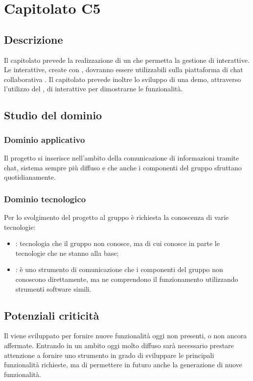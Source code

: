 \section{Capitolato C5}

\subsection{Descrizione}
Il capitolato prevede la realizzazione di un  che permetta la gestione di  interattive. Le  interattive, create con \ProjectName, dovranno essere utilizzabili sulla piattaforma di chat collaborativa .
Il capitolato prevede inoltre lo sviluppo di una demo, attraverso l'utilizzo del , di  interattive per dimostrarne le funzionalità.

\subsection{Studio del dominio}
\subsubsection{Dominio applicativo}
Il progetto si inserisce nell'ambito della comunicazione di informazioni tramite chat, sistema sempre più diffuso e che anche i componenti del gruppo sfruttano quotidianamente.

\subsubsection{Dominio tecnologico}
Per lo svolgimento del progetto al gruppo è richiesta la conoscenza di varie tecnologie:
\begin{itemize}
	\item {}: tecnologia che il gruppo non conosce, ma di cui conosce in parte le tecnologie che ne stanno alla base;
	\item {}: è uno strumento di comunicazione che i componenti del gruppo non conoscono direttamente, ma ne comprendono il funzionamento utilizzando strumenti software simili.
\end{itemize}

\subsection{Potenziali criticità}
Il  viene sviluppato per fornire nuove funzionalità oggi non presenti, o non ancora affermate. Entrando in un ambito oggi molto diffuso sarà necessario prestare attenzione a fornire uno strumento in grado di sviluppare le principali funzionalità richieste, ma di permettere in futuro anche la generazione di nuove funzionalità.

